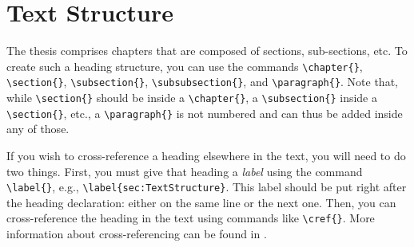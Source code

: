 \section{Text Structure}
\label{sec:TextStructure}

The thesis comprises chapters that are composed of sections, sub-sections, etc.
To create such a heading structure, you can use the commands \verb|\chapter{}|, \verb|\section{}|, \verb|\subsection{}|, \verb|\subsubsection{}|, and \verb|\paragraph{}|. 
Note that, while \verb|\section{}| should be inside a \verb|\chapter{}|, a \verb|\subsection{}| inside a \verb|\section{}|, etc., a \verb|\paragraph{}| is not numbered and can thus be added inside any of those.

If you wish to cross-reference a heading elsewhere in the text, you will need to do two things. 
First, you must give that heading a \emph{label} using the command \verb|\label{}|, e.g., \verb|\label{sec:TextStructure}|. This label should be put right after the heading declaration: either on the same line or the next one.
Then, you can cross-reference the heading in the text using commands like \verb|\cref{}|.
More information about cross-referencing can be found in .


